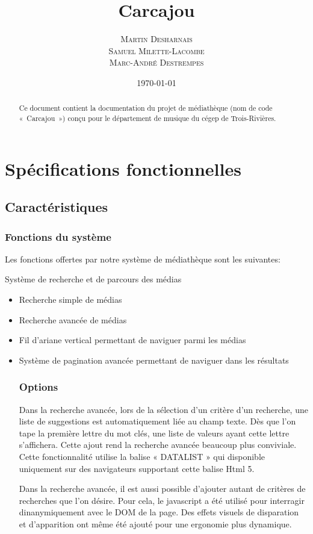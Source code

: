 \documentclass[letter, 10pt]{report}
\title{Carcajou}
\author{\textsc{Martin Desharnais} \\ \textsc{Samuel Milette-Lacombe} \\ \textsc{Marc-André Destrempes}}
\date{\today}
\begin{document}
\maketitle

\begin{abstract}
Ce document contient la documentation du projet de médiathèque (nom de code «~Carcajou~») conçu pour le département de musique du cégep de Trois-Rivières.
\end{abstract}

\newpage
\tableofcontents
\newpage

\chapter{Spécifications fonctionnelles}

\section{Caractéristiques}

\subsection{Fonctions du système}

Les fonctions offertes par notre système de médiathèque sont les suivantes:

Système de recherche et de parcours des médias
\begin{itemize}
\item Recherche simple de médias
\item Recherche avancée de médias
\item Fil d'ariane vertical permettant de naviguer parmi les médias
\item Système de pagination avancée permettant de naviguer dans les résultats

\subsection{Options}

Dans la recherche avancée, lors de la sélection d'un critère d'un recherche, une liste de suggestions est automatiquement liée au champ texte. Dès que l'on tape la première lettre du mot clés, une liste de valeurs ayant cette lettre s'affichera. Cette ajout rend la recherche avancée beaucoup plus conviviale. Cette fonctionnalité utilise la balise « DATALIST » qui disponible uniquement sur des navigateurs supportant cette balise Html 5.

Dans la recherche avancée, il est aussi possible d'ajouter autant de critères de recherches que l'on désire. Pour cela, le javascript a été utilisé pour interragir dinanymiquement avec le DOM de la page. Des effets visuels de disparation et d'apparition ont même été ajouté pour une ergonomie plus dynamique.


\end{itemize}
\end{document}
